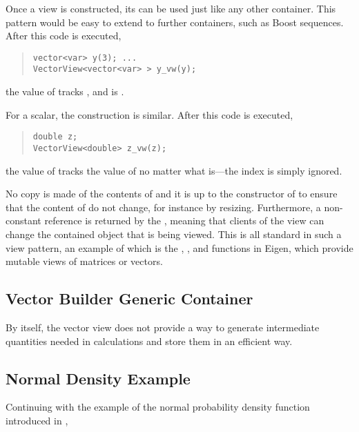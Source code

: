 \documentclass[10pt]{article}
\begin{document}
Once a view is constructed, its  can be used just
like any other container.   This pattern would be easy to extend to
further containers, such as Boost sequences.  After this code is
executed, 
%
\begin{quote}
\begin{Verbatim}
vector<var> y(3); ...
VectorView<vector<var> > y_vw(y);
\end{Verbatim}
\end{quote}
%
the value of  tracks , and
 is .  

For a scalar, the construction is similar.  After this code is
executed,
%
\begin{quote}
\begin{Verbatim}
double z;
VectorView<double> z_vw(z);
\end{Verbatim}
\end{quote}
%
the value of  tracks the value of  no matter
what  is---the index is simply ignored.  

No copy is made of the contents of  and it is up to the
constructor of  to ensure that the content of
 do not change, for instance by resizing.  Furthermore, a
non-constant reference is returned by the , meaning
that clients of the view can change the contained object that is being
viewed.  This is all standard in such a view pattern, an example of
which is the , , and  functions in
Eigen, which provide mutable views of matrices or vectors.

\subsection{Vector Builder Generic Container}

By itself, the vector view does not provide a way to generate
intermediate quantities needed in calculations and store them in an
efficient way.  


\subsection{Normal Density Example}

Continuing with the example of the normal probability density function
introduced in , 




\end{document}
